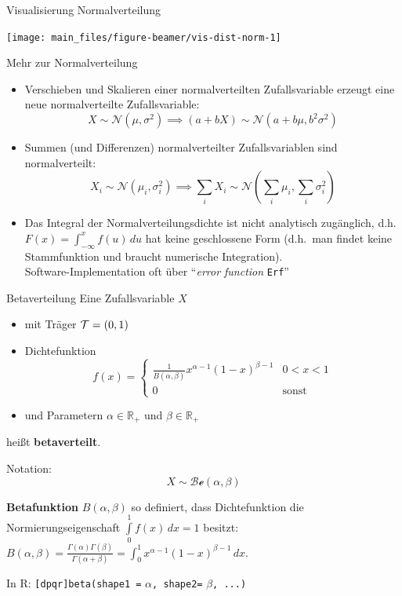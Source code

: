 \documentclass[
  10pt,
  ignorenonframetext,
]{beamer}
\providecommand{\tightlist}{%
  \setlength{\itemsep}{0pt}\setlength{\parskip}{0pt}}
\begin{document}
\begin{frame}{Visualisierung Normalverteilung}
\label{visualisierung-normalverteilung}
\scriptsize

\begin{center}\texttt{[image: main\_files/figure-beamer/vis-dist-norm-1]} \end{center}

\normalsize
\end{frame}

\begin{frame}[fragile]{Mehr zur Normalverteilung}
\label{mehr-zur-normalverteilung}
\begin{itemize}
\item
  Verschieben und Skalieren einer normalverteilten Zufallsvariable
  erzeugt eine neue normalverteilte Zufallsvariable:
  \[X \sim \mathcal{N}(\mu, \sigma^2) \implies (a + bX) \sim \mathcal{N}(a + b \mu, b^2\sigma^2)\]
\item
  Summen (und Differenzen) normalverteilter Zufallsvariablen sind
  normalverteilt:\\
  \[X_i \sim \mathcal{N}(\mu_i, \sigma_i^2) \implies \sum_i X_i \sim \mathcal{N}(\sum_i \mu_i, \sum_i \sigma_i^2)\]
\item
  Das Integral der Normalverteilungsdichte ist nicht analytisch
  zugänglich, d.h. \(F(x) = \int_{-\infty}^x f(u)\,du\) hat keine
  geschlossene Form (d.h.~man findet keine Stammfunktion und braucht
  numerische Integration).\\
  Software-Implementation oft über ``\emph{error function}
  \texttt{Erf}''
\end{itemize}
\end{frame}

\begin{frame}[fragile]{Betaverteilung}
\label{betaverteilung}
Eine Zufallsvariable \(X\)

\begin{itemize}
\tightlist
\item
  mit Träger \({\cal T} = (0,1)\)
\item
  Dichtefunktion \[
  f(x) =\begin{cases}
  \frac{1}{B(\alpha, \beta)} x^{\alpha - 1} (1 - x)^{\beta - 1} &  0 < x < 1  \\
  0 & \mbox{sonst}
  \end{cases}
  \]
\item
  und Parametern \(\alpha \in \mathbb{R}_+\) und
  \(\beta \in \mathbb{R}_+\)
\end{itemize}

heißt \textbf{betaverteilt}.~

Notation: \[X \sim \mathcal{Be}(\alpha, \beta)\]

\textbf{Betafunktion} \(B(\alpha, \beta)\) so definiert, dass
Dichtefunktion die Normierungseigenschaft
\(\int\limits_0^1 f(x) \,dx = 1\) besitzt:
\(B(\alpha, \beta) = \frac{\Gamma(\alpha)\Gamma(\beta)}{\Gamma(\alpha+\beta)} = \int_0^1 x^{\alpha-1} (1-x)^{\beta-1} \,dx.\)

In R: \texttt{{[}dpqr{]}beta(shape1\ =} \(\alpha\)\texttt{,\ shape2=}
\(\beta\)\texttt{,\ ...)}
\end{frame}
\end{document}
